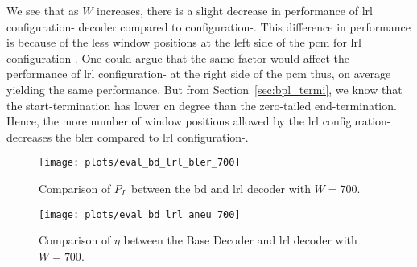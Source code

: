 We see that as $W$ increases, there is a slight decrease in performance of \gls{lrl} configuration- decoder compared to configuration-. This difference in performance is because of the less window positions at the left side of the \gls{pcm} for \gls{lrl} configuration-. One could argue that the same factor would affect the performance of \gls{lrl} configuration- at the right side of the \gls{pcm} thus, on average yielding the same performance. But from Section~\ref{sec:bpl_termi}, we know that the start-termination has lower \gls{cn} degree than the zero-tailed end-termination. Hence, the more number of window positions allowed by the \gls{lrl} configuration- decreases the \gls{bler} compared to \gls{lrl} configuration-.
\begin{figure}[htbp]
  \centering
  \texttt{[image: plots/eval\_bd\_lrl\_bler\_700]}
  \caption[Comparison of \acrshort{bler} between the \acrshort{bd} and \acrshort{lrl} decoder with $W=700$]{Comparison of $P_L$ between the \gls{bd} and \gls{lrl} decoder with $W=700$.}
  \label{fig:eval_bd_lrl_bler_700}
\end{figure}
\begin{figure}[htbp]
  \centering
  \texttt{[image: plots/eval\_bd\_lrl\_aneu\_700]}
  \caption[Comparison of \acrshort{aneu} between the \acrshort{bd} and \acrshort{lrl} decoder with $W=700$.]{Comparison of $\eta$ between the Base Decoder and \gls{lrl} decoder with $W=700$.}
  \label{fig:eval_bd_lrl_aneu_700}
\end{figure}


